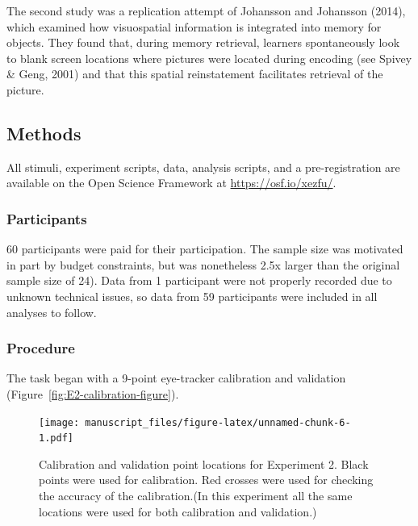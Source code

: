 \documentclass[
  man,floatsintext]{apa6}
\begin{document}
The second study was a replication attempt of Johansson and Johansson (2014),
which examined how visuospatial information is integrated into memory
for objects. They found that, during memory retrieval, learners
spontaneously look to blank screen locations where pictures were located
during encoding (see Spivey \& Geng, 2001) and that
this spatial reinstatement facilitates retrieval of the picture.

\hypertarget{methods-1}{%
\subsection{Methods}\label{methods-1}}

All stimuli, experiment scripts, data, analysis scripts, and a
pre-registration are available on the Open Science Framework at
\url{https://osf.io/xezfu/}.

\hypertarget{participants-2}{%
\subsubsection{Participants}\label{participants-2}}

60 participants were paid for their participation.
The sample size was motivated in part by budget constraints, but was
nonetheless 2.5x larger than the original sample size of 24).
Data from 1 participant were not properly
recorded due to unknown technical issues, so data from 59 participants
were included in all analyses to follow.

\hypertarget{procedure-1}{%
\subsubsection{Procedure}\label{procedure-1}}

The task began with a 9-point eye-tracker calibration
and validation (Figure~\ref{fig:E2-calibration-figure}).

\begin{figure}
\centering
\texttt{[image: manuscript\_files/figure-latex/unnamed-chunk-6-1.pdf]}
\caption{\label{fig:unnamed-chunk-6}Calibration and validation point locations for Experiment 2. Black points were used for calibration. Red crosses were used for checking the accuracy of the calibration.(In this experiment all the same locations were used for both calibration and validation.)}
\end{figure}
\end{document}
